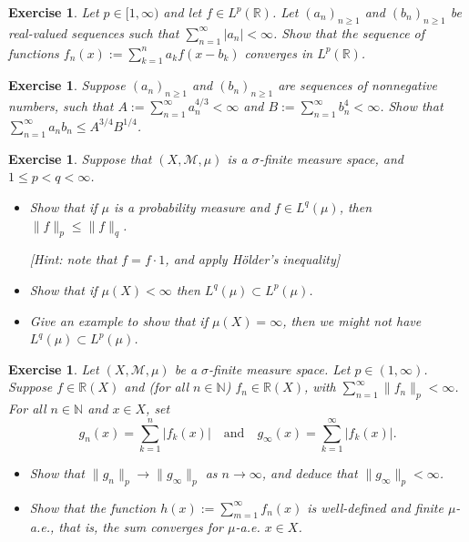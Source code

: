 \documentclass{article}
\newtheorem{exercise}[theorem]{Exercise}
\begin{document}
\begin{exercise}
Let $p \in [1, \infty)$ and let $f \in L^p(\mathbb{R})$. Let $(a_n)_{n \geq 1}$ and $(b_n)_{n \geq 1}$ be real-valued sequences such that $\sum_{n=1}^{\infty} |a_n| < \infty$. Show that the sequence of functions $f_n(x) := \sum_{k=1}^{n} a_k f(x - b_k)$ converges in $L^p(\mathbb{R})$.
\end{exercise}

\begin{exercise}
Suppose $(a_n)_{n \geq 1}$ and $(b_n)_{n \geq 1}$ are sequences of nonnegative numbers, such that $A := \sum_{n=1}^{\infty} a_n^{4/3} < \infty$ and $B := \sum_{n=1}^{\infty} b_n^4 < \infty$. Show that $\sum_{n=1}^{\infty} a_n b_n \leq A^{3/4} B^{1/4}$.
\end{exercise}

\begin{exercise}
Suppose that $(X, \mathcal{M}, \mu)$ is a $\sigma$-finite measure space, and $1 \leq p < q < \infty$.
\begin{itemize}
    \item[(a)] Show that if $\mu$ is a probability measure and $f \in L^q(\mu)$, then $\|f\|_p \leq \|f\|_q$.

    \textit{[Hint: note that $f = f \cdot 1$, and apply Hölder’s inequality]}
    
    \item[(b)] Show that if $\mu(X) < \infty$ then $L^q(\mu) \subset L^p(\mu)$.
    
    \item[(c)] Give an example to show that if $\mu(X) = \infty$, then we might not have $L^q(\mu) \subset L^p(\mu)$.
\end{itemize}
\end{exercise}

\begin{exercise}
Let $(X, \mathcal{M}, \mu)$ be a $\sigma$-finite measure space. Let $p \in (1, \infty)$. Suppose $f \in \mathbb{R}(X)$ and (for all $n \in \mathbb{N}$) $f_n \in \mathbb{R}(X)$, with $\sum_{n=1}^{\infty} \|f_n\|_p < \infty$. For all $n \in \mathbb{N}$ and $x \in X$, set
\[
g_n(x) = \sum_{k=1}^{n} |f_k(x)| \quad \text{and} \quad g_{\infty}(x) = \sum_{k=1}^{\infty} |f_k(x)|.
\]
\begin{itemize}
    \item[(i)] Show that $\|g_n\|_p \to \|g_{\infty}\|_p$ as $n \to \infty$, and deduce that $\|g_{\infty}\|_p < \infty$.
    
    \item[(ii)] Show that the function $h(x) := \sum_{m=1}^{\infty} f_n(x)$ is well-defined and finite $\mu$-a.e., that is, the sum converges for $\mu$-a.e. $x \in X$.
\end{itemize}
\end{exercise}
\end{document}
